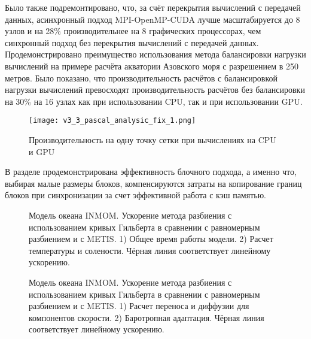 Было также подремонтировано, что, за счёт перекрытия вычислений с передачей данных, асинхронный подход MPI-OpenMP-CUDA лучше масштабируется до 8 узлов и на 28\% производительнее на 8 графических процессорах, чем синхронный подход без перекрытия вычислений с передачей данных. Продемонстрировано преимущество использования метода балансировки нагрузки вычислений на примере расчёта акватории Азовского моря с разрешением в 250 метров. Было показано, что производительность расчётов с балансировкой нагрузки вычислений превосходят производительность расчётов без балансировки на 30\% на 16 узлах как при использовании CPU, так и при использовании GPU.

\begin{figure}[!ht]
	\begin{minipage}{1\linewidth}
	\centering
	\texttt{[image: v3\_3\_pascal\_analysic\_fix\_1.png]}
	\end{minipage}
	\vspace{3pt}
	\caption{Производительность на одну точку сетки при вычислениях на CPU и GPU}
	\label{fig:TheBox_full}
\end{figure}

В разделе продемонстрирована эффективность блочного подхода, а именно что,
выбирая малые размеры блоков, компенсируются затраты на копирование границ блоков при синхронизации за счет эффективной работа с кэш памя­тью.

	\begin{figure}[htb!]
    \begin{minipage}[h]{0.48\linewidth}
    \end{minipage}
    \hfill
    \begin{minipage}[h]{0.48\linewidth}
    \end{minipage}
    \caption{Модель океана INMOM. Ускорение метода разбиения с использованием кривых Гильберта в сравнении с равномерным разбиением и с METIS. 1) Общее время работы модели. 2) Расчет температуры и солености. 
    Чёрная линия соответствует линейному ускорению.}
    \label{fig:inmom_hilbert1}
    \end{figure}
    
     \begin{figure}[htb!]
    \begin{minipage}[h]{0.48\linewidth}
    \end{minipage}
    \hfill
    \begin{minipage}[h]{0.48\linewidth}
    \end{minipage}
    \caption{Модель океана INMOM. Ускорение метода разбиения с использованием кривых Гильберта в сравнении с равномерным разбиением и с METIS. 1) Расчет переноса и диффузии для компонентов скорости. 2) Баротропная адаптация. 
    Чёрная линия соответствует линейному ускорению.}
    \label{fig:inmom_hilbert2}
    \end{figure}
    
